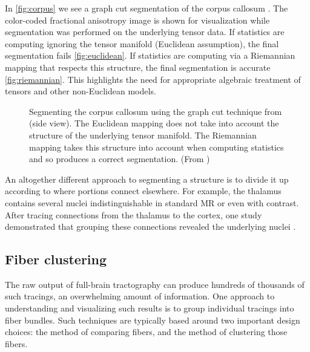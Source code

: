 \documentclass[final,hyperref]{gatech-thesis}
\begin{document}
In \autoref{fig:corpus} we see a graph cut segmentation of the corpus callosum
\cite{Malcolm2007tc}.  The color-coded fractional anisotropy image is shown
for visualization while segmentation was performed on the underlying tensor
data.  If statistics are computing ignoring the tensor manifold (Euclidean
assumption), the final segmentation fails \autoref{fig:euclidean}.  If
statistics are computing via a Riemannian mapping that respects this
structure, the final segmentation is accurate \autoref{fig:riemannian}.  This
highlights the need for appropriate algebraic treatment of tensors and other
non-Euclidean models.
\begin{figure}[t]
  \centering
  \caption{Segmenting the corpus callosum using the graph cut technique from
    \cite{Malcolm2007tc} (side view).  The Euclidean mapping
     does not take into account the structure of the
    underlying tensor manifold.  The Riemannian mapping
     takes this structure into account when computing
    statistics and so produces a correct segmentation. (From
    \cite{Malcolm2007tc})}
  \label{fig:corpus}
\end{figure}

An altogether different approach to segmenting a structure is to divide it up
according to where portions connect elsewhere.  For example, the thalamus
contains several nuclei indistinguishable in standard MR or even with
contrast.  After tracing connections from the thalamus to the cortex, one
study demonstrated that grouping these connections revealed the underlying
nuclei \cite{Behrens2003nn}.




\subsection{Fiber clustering}

The raw output of full-brain tractography can produce hundreds of thousands of
such tracings, an overwhelming amount of information.  One approach to
understanding and visualizing such results is to group individual tracings
into fiber bundles.  Such techniques are typically based around two important
design choices: the method of comparing fibers, and the method of clustering
those fibers.
\end{document}
